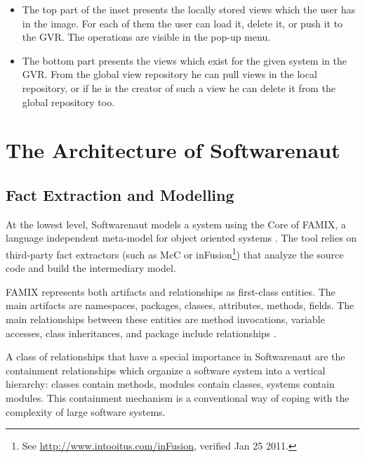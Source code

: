 \documentclass[preprint,12pt]{elsarticle}
\newcommand\on[1]{\nbc{ON}{#1}{red}} %
\begin{document}
\begin{itemize}

\item The top part of the inset presents the locally stored views which the user has in the image. For each of them the user can load it, delete it, or push it to the GVR. The operations are visible in the pop-up menu. %

\item The bottom part presents the views which exist for the given system in the GVR. From the global view repository he can pull views in the local repository, or if he is the creator of such a view he can delete it from the global repository too. 

\end{itemize}


\section {The Architecture of Softwarenaut} 


\subsection {Fact Extraction and Modelling} \label{sec:facts}

At the lowest level, Softwarenaut models a system using the Core of FAMIX, a language independent meta-model for object oriented systems \cite{tichelaar-thesis}. The tool relies on third-party fact extractors (such as McC \cite{pepi-mcc} or inFusion\footnote{See \url{http://www.intooitus.com/inFusion}, verified Jan 25 2011.}) that analyze the source code and build the intermediary model.

FAMIX represents both artifacts and relationships as first-class entities. The main artifacts are namespaces, packages, classes, attributes, methods, fields. The main relationships between these entities are method invocations, variable accesses, class inheritances, and package include relationships \cite{tichelaar-thesis}.

A class of relationships that have a special importance in Softwarenaut are the containment relationships which organize a software system into a vertical hierarchy: classes contain methods, modules contain classes, systems contain modules. This containment mechanism is a {conventional} way of coping with the complexity of large software systems.
\end{document}
